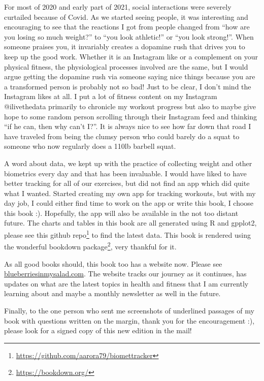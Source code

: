 \documentclass[
  oneside]{book}
\DeclareRobustCommand{\href}[2]{#2\footnote{\url{#1}}}
\begin{document}
For most of 2020 and early part of 2021, social interactions were severely curtailed because of Covid. As we started seeing people, it was interesting and encouraging to see that the reactions I got from people changed from ``how are you losing so much weight?'' to ``you look athletic!'' or ``you look strong!''. When someone praises you, it invariably creates a dopamine rush that drives you to keep up the good work. Whether it is an Instagram like or a complement on your physical fitness, the physiological processes involved are the same, but I would argue getting the dopamine rush via someone saying nice things because you are a transformed person is probably not so bad! Just to be clear, I don't mind the Instagram likes at all. I put a lot of fitness content on my Instagram @ilivethedata primarily to chronicle my workout progress but also to maybe give hope to some random person scrolling through their Instagram feed and thinking ``if he can, then why can't I?''. It is always nice to see how far down that road I have traveled from being the clumsy person who could barely do a squat to someone who now regularly does a 110lb barbell squat.

A word about data, we kept up with the practice of collecting weight and other biometrics every day and that has been invaluable. I would have liked to have better tracking for all of our exercises, but did not find an app which did quite what I wanted. Started creating my own app for tracking workouts, but with my day job, I could either find time to work on the app or write this book, I choose this book :). Hopefully, the app will also be available in the not too distant future. The charts and tables in this book are all generated using R and gpplot2, please see this \href{https://github.com/aarora79/biomettracker}{github repo} to find the latest data. This book is rendered using the wonderful \href{https://bookdown.org/}{bookdown package}, very thankful for it.

As all good books should, this book too has a website now. Please see \url{blueberriesinmysalad.com}. The website tracks our journey as it continues, has updates on what are the latest topics in health and fitness that I am currently learning about and maybe a monthly newsletter as well in the future.

Finally, to the one person who sent me screenshots of underlined passages of my book with questions written on the margin, thank you for the encouragement :), please look for a signed copy of this new edition in the mail!
\end{document}
